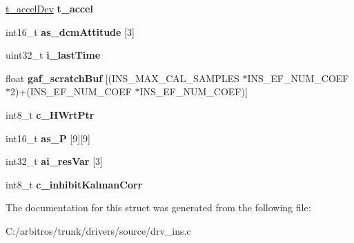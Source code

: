\begin{DoxyCompactItemize}
\item 
\hypertarget{structt__ins_dev_af690e4b78140f9bef2dd0b2a0461eb31}{\hyperlink{structt__accel_dev}{t\-\_\-accel\-Dev} {\bfseries t\-\_\-accel}}\label{structt__ins_dev_af690e4b78140f9bef2dd0b2a0461eb31}

\item 
\hypertarget{structt__ins_dev_a07ba22ab5c7d749b6e6ff5b29576c984}{int16\-\_\-t {\bfseries as\-\_\-dcm\-Attitude} \mbox{[}3\mbox{]}}\label{structt__ins_dev_a07ba22ab5c7d749b6e6ff5b29576c984}

\item 
\hypertarget{structt__ins_dev_a6eaf33370dad961b48a6fa95c2e630b9}{uint32\-\_\-t {\bfseries i\-\_\-last\-Time}}\label{structt__ins_dev_a6eaf33370dad961b48a6fa95c2e630b9}

\item 
\hypertarget{structt__ins_dev_a94dda6ce6948c2c59492a8e96c1f0549}{float {\bfseries gaf\-\_\-scratch\-Buf} \mbox{[}(I\-N\-S\-\_\-\-M\-A\-X\-\_\-\-C\-A\-L\-\_\-\-S\-A\-M\-P\-L\-E\-S $\ast$I\-N\-S\-\_\-\-E\-F\-\_\-\-N\-U\-M\-\_\-\-C\-O\-E\-F $\ast$2)+(I\-N\-S\-\_\-\-E\-F\-\_\-\-N\-U\-M\-\_\-\-C\-O\-E\-F $\ast$I\-N\-S\-\_\-\-E\-F\-\_\-\-N\-U\-M\-\_\-\-C\-O\-E\-F)\mbox{]}}\label{structt__ins_dev_a94dda6ce6948c2c59492a8e96c1f0549}

\item 
\hypertarget{structt__ins_dev_a220fcc636d21e05e7b5656b22e262229}{int8\-\_\-t {\bfseries c\-\_\-\-H\-Wrt\-Ptr}}\label{structt__ins_dev_a220fcc636d21e05e7b5656b22e262229}

\item 
\hypertarget{structt__ins_dev_a520c0cda90cbdf45c52df9fedb82a547}{int16\-\_\-t {\bfseries as\-\_\-\-P} \mbox{[}9\mbox{]}\mbox{[}9\mbox{]}}\label{structt__ins_dev_a520c0cda90cbdf45c52df9fedb82a547}

\item 
\hypertarget{structt__ins_dev_a32bca0f6e329904807bd72001d9f2bf9}{int32\-\_\-t {\bfseries ai\-\_\-res\-Var} \mbox{[}3\mbox{]}}\label{structt__ins_dev_a32bca0f6e329904807bd72001d9f2bf9}

\item 
\hypertarget{structt__ins_dev_ae2091164da27fd79020d0d27e7ad1d34}{int8\-\_\-t {\bfseries c\-\_\-inhibit\-Kalman\-Corr}}\label{structt__ins_dev_ae2091164da27fd79020d0d27e7ad1d34}

\end{DoxyCompactItemize}


The documentation for this struct was generated from the following file\-:\begin{DoxyCompactItemize}
\item 
C\-:/arbitros/trunk/drivers/source/drv\-\_\-ins.\-c\end{DoxyCompactItemize}
